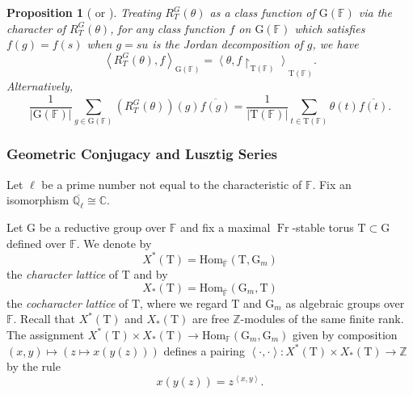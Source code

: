 \documentclass[12pt, reqno]{amsart}
\newtheorem{proposition}[theorem]{Proposition}
\theoremstyle{definition}
\theoremstyle{definition}
\theoremstyle{definition}
\newcommand{\zIntegers}{\mathbb{Z}}
\newcommand{\cComplex}{\mathbb{C}}
\newcommand{\Hom}{\mathrm{Hom}}
\newcommand{\conjugate}[1]{\overline{#1}}
\newcommand{\sizeof}[1]{\left|#1\right|}
\newcommand{\innerproduct}[2]{\left\langle #1,#2\right\rangle}
\newcommand{\finiteField}{\mathbb{F}}
\newcommand{\algebraicClosure}[1]{\overline{#1}}
\newcommand{\Frobenius}{\operatorname{Fr}}
\newcommand{\multiplcativeScheme}{\algebraicGroup{G}_m}
\newcommand{\ladicnumbers}{\algebraicClosure{\mathbb{Q}_{\ell}}}
\newcommand{\algebraicGroup}[1]{\boldsymbol{\mathrm{#1}}}
\newcommand{\CharacterLattice}[1]{X^{\ast}\left(#1\right)}
\newcommand{\CocharacterLattice}[1]{X_{\ast}\left(#1\right)}
\begin{document}
\begin{proposition}[{\cite[Corollary 12.6]{DigneMichel1991} or \cite[Theorem 1.2]{SaitoShinoda2000}}]
\label{prop:semisimple_pair_with_RTtheta}
Treating $R_T^G(\theta)$ as a class function of $\algebraicGroup{G}(\finiteField)$ via the character of $R_T^G(\theta)$, for any class function $f$ on $\algebraicGroup{G}(\finiteField)$ which satisfies $f(g) = f(s)$ when $g=su$ is the Jordan decomposition of $g$, we have
\[
	\innerproduct{R_T^G(\theta)}{f}_{\algebraicGroup{G}(\finiteField)} = \innerproduct{\theta}{f\restriction_{\algebraicGroup{T}(\finiteField)}}_{\algebraicGroup{T}(\finiteField)}.
\]
Alternatively,
\[
	\frac{1}{\sizeof{\algebraicGroup{G}(\finiteField)}}\sum_{g \in \algebraicGroup{G}(\finiteField)}\left(R_T^G(\theta)\right)(g)\conjugate{f(g)} = \frac{1}{\sizeof{\algebraicGroup{T}(\finiteField)}}\sum_{t \in  \algebraicGroup{T}(\finiteField)} \theta(t)\conjugate{f(t)}.
\]
\end{proposition}

\subsubsection{Geometric Conjugacy and Lusztig Series}
Let $\ell$ be a prime number not equal to the characteristic of $\finiteField$. Fix an isomorphism $\ladicnumbers \cong \cComplex$.

Let $\algebraicGroup{G}$ be a reductive group over $\finiteField$ and fix a maximal $\Frobenius$-stable torus $\algebraicGroup{T} \subset \algebraicGroup{G}$ defined over $\finiteField$. We denote by $$\CharacterLattice{\algebraicGroup{T}} = \Hom_{\algebraicClosure{\finiteField}}\left(\algebraicGroup{T}, \multiplcativeScheme\right)$$ the \emph{character lattice} of $\algebraicGroup{T}$ and by $$\CocharacterLattice{\algebraicGroup{T}} = \Hom_{\algebraicClosure{\finiteField}}\left(\multiplcativeScheme, \algebraicGroup{T}\right)$$ the \emph{cocharacter lattice} of $\algebraicGroup{T}$, where we regard $\algebraicGroup{T}$ and $\multiplcativeScheme$ as algebraic groups over $\finiteField$. Recall that $\CharacterLattice{\algebraicGroup{T}}$ and $\CocharacterLattice{\algebraicGroup{T}}$ are free $\zIntegers$-modules of the same finite rank. The assignment $\CharacterLattice{\algebraicGroup{T}} \times \CocharacterLattice{\algebraicGroup{T}} \to \Hom_{\finiteField}\left(\multiplcativeScheme, \multiplcativeScheme\right)$ given by composition $\left(x,y\right) \mapsto \left(z \mapsto x\left(y\left(z\right)\right)\right)$ defines a pairing $\innerproduct{\cdot}{\cdot} \colon \CharacterLattice{\algebraicGroup{T}} \times \CocharacterLattice{\algebraicGroup{T}} \to \zIntegers$ by the rule $$x\left(y\left(z\right)\right) = z^{\innerproduct{x}{y}}.$$
\end{document}
